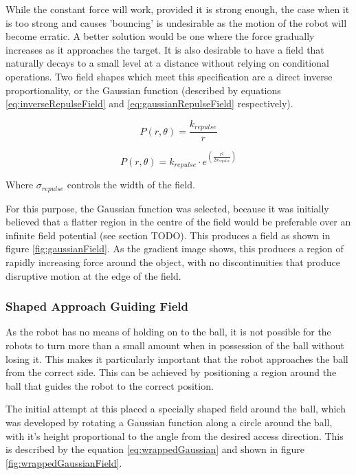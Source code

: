 \documentclass[10pt]{article}
\begin{document}
While the constant force will work, provided it is strong enough, the case when it is too strong and causes 'bouncing' is undesirable as the motion of the robot will become erratic. A better solution would be one where the force gradually increases as it approaches the target. It is also desirable to have a field that naturally decays to a small level at a distance without relying on conditional operations. Two field shapes which meet this specification are a direct inverse proportionality, or the Gaussian function (described by equations \ref{eq:inverseRepulseField} and \ref{eq:gaussianRepulseField} respectively).

\begin{equation}
P\left(r,\theta\right)=\frac{k_{repulse}}{r}\label{eq:inverseRepulseField}
\end{equation}

\begin{equation}
P\left(r,\theta\right)=k_{repulse}\cdot e^{\left(\frac{r^{2}}{2\sigma_{repulse}}\right)}\label{eq:gaussianRepulseField}
\end{equation}

Where $\sigma_{repulse}$ controls the width of the field.

For this purpose, the Gaussian function was selected, because it was initially believed that a flatter region in the centre of the field would be preferable over an infinite field potential (see section TODO). This produces a field as shown in figure \ref{fig:gaussianField}. As the gradient image shows, this produces a region of rapidly increasing force around the object, with no discontinuities that produce disruptive motion at the edge of the field.

\subsubsection{Shaped Approach Guiding Field\label{sub:Shaped-Approach-Guiding}}

As the robot has no means of holding on to the ball, it is not possible for the robots to turn more than a small amount when in possession of the ball without losing it. This makes it particularly important that the robot approaches the ball from the correct side. This can be achieved by positioning a region around the ball that guides the robot to the correct position.

The initial attempt at this placed a specially shaped field around the ball, which was developed by rotating a Gaussian function along a circle around the ball, with it's height proportional to the angle from the desired access direction. This is described by the equation \ref{eq:wrappedGaussian} and shown in figure \ref{fig:wrappedGaussianField}.
\end{document}
